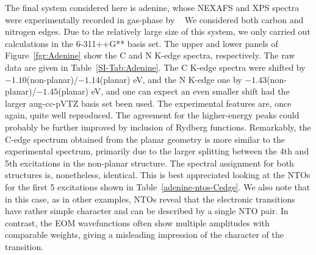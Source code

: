 \documentclass[journal=jctcce,manuscript=article]{achemso}
\begin{document}
\begin{table}[H]
\begin{tabular}{ c | c c c }
    \\
    \hline
\end{tabular}
\end{table}

The final system considered here is adenine, whose NEXAFS and XPS spectra were experimentally recorded in gas-phase by \citeauthor{nexafs_thymine_adenine}~\cite{nexafs_thymine_adenine} 
We considered both carbon and nitrogen edges. Due to the relatively large size of this system, we only carried out
calculations in the 6-311++G** basis set.
The upper and lower panels of Figure~\ref{fgr:Adenine} show the C and N K-edge spectra, 
respectively.
The raw data are given in Table~\ref{SI-Tab:Adenine}.
The C K-edge spectra were shifted by $-1.10$(non-planar)/$-1.14$(planar) eV,
and the N K-edge one by $-1.43$(non-planar)/$-1.45$(planar) eV, and one can expect an even smaller shift had the larger aug-cc-pVTZ basis set been used.
The experimental features are, once again, quite well reproduced. The agreement for the higher-energy peaks could probably be further improved by inclusion of Rydberg functions.
Remarkably, the C-edge spectrum obtained from the planar geometry is more similar to the experimental spectrum, primarily due to the larger splitting between the 4th and 5th excitations in the non-planar structure. The spectral assignment for both structures is, nonetheless, identical. This is best appreciated looking at the NTOs for the  first 5 excitations shown in Table~\ref{adenine-ntos-Cedge}.
We also note that in this case, as in other examples, NTOs reveal that the electronic transitions have rather simple character and can be described by a single NTO pair. In contrast, the EOM wavefunctions often show multiple amplitudes with comparable weights, giving a misleading impression of the character of the transition. 
\end{document}
